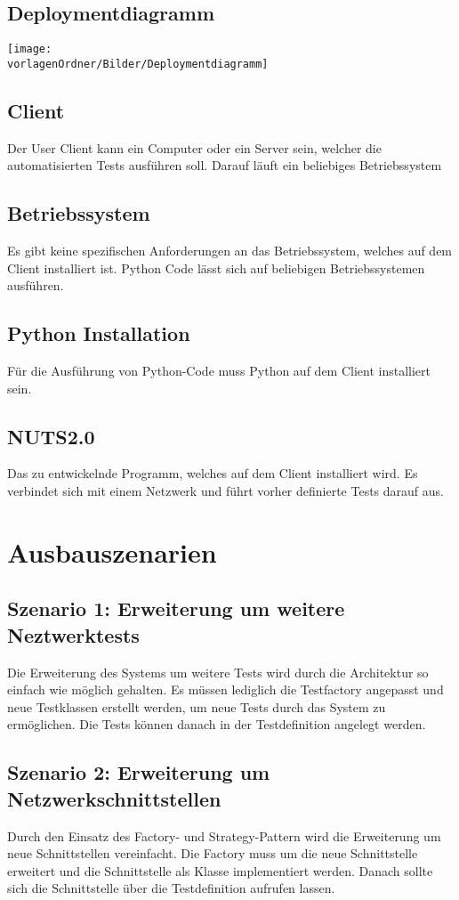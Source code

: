 \documentclass[
	ngerman,
	toc=listof, %
	toc=bibliography, %
	footnotes=multiple, %
	parskip=half, %
	numbers=noendperiod %
]{scrartcl}
\newcommand{\vorlagenOrdner}{../../99_Vorlagen} %
\begin{document}
	\subsection{Deploymentdiagramm}
		\texttt{[image: \\vorlagenOrdner/Bilder/Deploymentdiagramm]}
	
		\subsection{Client}
		Der User Client kann ein Computer oder ein Server sein, welcher die automatisierten Tests ausführen soll.
		Darauf läuft ein beliebiges Betriebssystem

		\subsection{Betriebssystem}
		Es gibt keine spezifischen Anforderungen an das Betriebssystem, welches auf dem Client installiert ist.
		Python Code lässt sich auf beliebigen Betriebssystemen ausführen.

		\subsection{Python Installation}
		Für die Ausführung von Python-Code muss Python auf dem Client installiert sein. 

		\subsection{NUTS2.0}
		Das zu entwickelnde Programm, welches auf dem Client installiert wird. 
		Es verbindet sich mit einem Netzwerk und führt vorher definierte Tests darauf aus.

\section{Ausbauszenarien}
	\subsection{Szenario 1: Erweiterung um weitere Neztwerktests}
	Die Erweiterung des Systems um weitere Tests wird durch die Architektur so einfach wie möglich gehalten.
	Es müssen lediglich die Testfactory angepasst und neue Testklassen erstellt werden, um neue Tests durch das System zu ermöglichen.
	Die Tests können danach in der Testdefinition angelegt werden.

	\subsection{Szenario 2: Erweiterung um Netzwerkschnittstellen}
	Durch den Einsatz des Factory- und Strategy-Pattern wird die Erweiterung um neue Schnittstellen vereinfacht.
	Die Factory muss um die neue Schnittstelle erweitert und die Schnittstelle als Klasse implementiert werden.
	Danach sollte sich die Schnittstelle über die Testdefinition aufrufen lassen.
\end{document}
